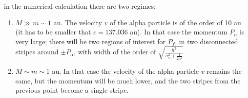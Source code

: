 \begin{importantbox}
  in the numerical calculation there are two regimes:
  \begin{enumerate}
    \item $M\gg m \sim 1$ au. The velocity $v$ of the alpha particle is of the order of 10 au (it has to be smaller that $c = 137.036$ au). In that case the momentum $P_\alpha$ is very large; there will be two regions of interest for $P_f$, in two disconnected stripes around $\pm P_\alpha$, with width of the order of $\sqrt{\frac{\hbar^2 }{\sigma_V^2 + \frac1{2\alpha^2}}}$

    \item $M\sim m\sim1$ au. In that case the velocity of the alpha particle $v$ remains the same, but the momentum will be much lower, and the two stripes from the previous point become a single stripe.
  \end{enumerate}
\end{importantbox}
